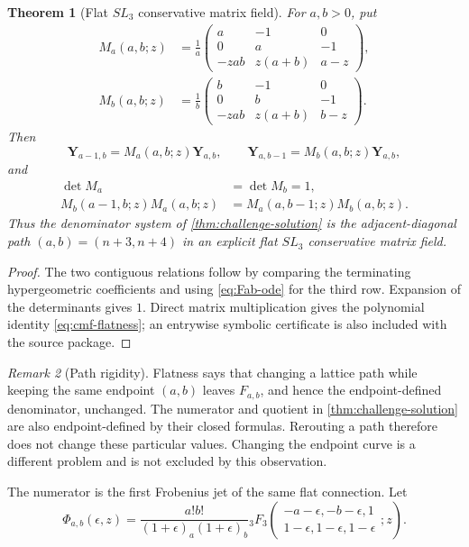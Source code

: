 \documentclass[11pt]{article}
\newtheorem{theorem}{Theorem}[section]
\theoremstyle{definition}
\theoremstyle{remark}
\newtheorem{remark}[theorem]{Remark}
\begin{document}
\begin{theorem}[Flat \(SL_3\) conservative matrix field]
\label{thm:flat-cmf}
For \(a,b>0\), put
\begin{align}
 M_a(a,b;z)&=\frac1a
 \begin{pmatrix}
 a&-1&0\\
 0&a&-1\\
 -zab&z(a+b)&a-z
 \end{pmatrix},\label{eq:Ma}\\
 M_b(a,b;z)&=\frac1b
 \begin{pmatrix}
 b&-1&0\\
 0&b&-1\\
 -zab&z(a+b)&b-z
 \end{pmatrix}.\label{eq:Mb}
\end{align}
Then
\[
 \mathbf Y_{a-1,b}=M_a(a,b;z)\mathbf Y_{a,b},
 \qquad
 \mathbf Y_{a,b-1}=M_b(a,b;z)\mathbf Y_{a,b},
\]
and
\begin{align}
 \det M_a&=\det M_b=1,\label{eq:cmf-det}\\
 M_b(a-1,b;z)M_a(a,b;z)
 &=M_a(a,b-1;z)M_b(a,b;z).
 \label{eq:cmf-flatness}
\end{align}
Thus the denominator system of \cref{thm:challenge-solution} is the
adjacent-diagonal path \((a,b)=(n+3,n+4)\) in an explicit flat \(SL_3\)
conservative matrix field.
\end{theorem}

\begin{proof}
The two contiguous relations follow by comparing the terminating
hypergeometric coefficients and using \eqref{eq:Fab-ode} for the third row.
Expansion of the determinants gives \(1\).  Direct matrix multiplication
gives the polynomial identity \eqref{eq:cmf-flatness}; an entrywise symbolic
certificate is also included with the source package.
\end{proof}

\begin{remark}[Path rigidity]
Flatness says that changing a lattice path while keeping the same endpoint
\((a,b)\) leaves \(F_{a,b}\), and hence the endpoint-defined denominator,
unchanged.  The numerator and quotient in \cref{thm:challenge-solution} are
also endpoint-defined by their closed formulas.  Rerouting a path therefore
does not change these particular values.  Changing the endpoint curve is a
different problem and is not excluded by this observation.
\end{remark}

The numerator is the first Frobenius jet of the same flat connection.  Let
\begin{equation}\label{eq:Phi-epsilon}
 \Phi_{a,b}(\epsilon,z)=
 \frac{a!b!}{(1+\epsilon)_a(1+\epsilon)_b}
 {}_3F_3\!\left(
 \begin{matrix}-a-\epsilon,-b-\epsilon,1\\
 1-\epsilon,1-\epsilon,1-\epsilon
 \end{matrix};z\right).
\end{equation}
\end{document}
